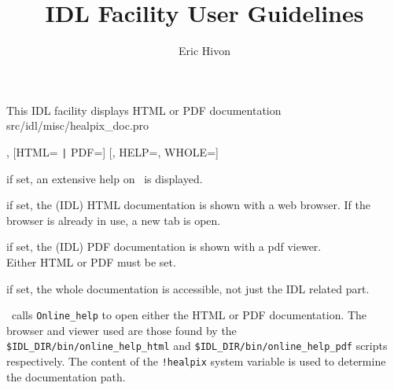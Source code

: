 


\sloppy



\title{\healpix IDL Facility User Guidelines}
 \section[healpix\_doc: PDF and HTML documentation]{ }
\label{idl:healpix_doc}
\author{Eric Hivon}




\begin{facility}
{This IDL facility displays HTML or PDF \healpix documentation}
{src/idl/misc/healpix\_doc.pro}
\end{facility}

\begin{IDLformat}
{\thedocid , [HTML= {\tt |} PDF=] [, HELP=,  WHOLE=] }
\end{IDLformat}

\begin{keywords}
  \begin{kwlist}{} %
    \item[HELP=] if set, an extensive help on \thedocid\ is displayed.
    \item[HTML=]  if set, the \healpix (IDL) HTML documentation is shown with a web browser.
            If the browser is already in use, a new tab is open.
    \item[PDF=]   if set, the \healpix (IDL) PDF documentation is shown with a pdf viewer.\\
            Either HTML or PDF must be set.
    \item[WHOLE=]  if set, the whole \healpix documentation is accessible,
              not just the IDL related part.
  \end{kwlist}
\end{keywords}  

\begin{codedescription}
{\thedocid\  calls {\tt Online\_help} to open either the HTML or PDF \healpix
documentation. The browser and viewer used are those found by the 
{\tt \$IDL\_DIR/bin/online\_help\_html} and 
{\tt \$IDL\_DIR/bin/online\_help\_pdf} scripts respectively.
The content of the {\tt !healpix} system variable is used to
determine the documentation path.}
\end{codedescription}



